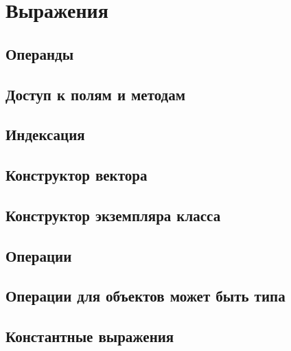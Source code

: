 \hypertarget{expressions}{%
\section{Выражения}\label{expr:chapter}}

\hypertarget{operands}{%
\subsection{Операнды}\label{expr:operands}}

\hypertarget{selector}{%
\subsection{Доступ к полям и методам}\label{expr:selector}}

\hypertarget{indexation}{%
\subsection{Индексация}\label{expr:indexation}}


\hypertarget{vector-composite}{%
\subsection{Конструктор вектора}\label{expr:vector-composite}}

\hypertarget{class-composite}{%
\subsection{Конструктор экземпляра класса}\label{expr:class-composite}}


\hypertarget{operators}{%
\subsection{Операции}\label{expr:operators}}

\hypertarget{mb-ops}{%
\subsection{Операции для объектов может быть типа}\label{expr:mb-ops}}


\hypertarget{const-expr}{%
\subsection{Константные выражения}\label{expr:const-expr}}